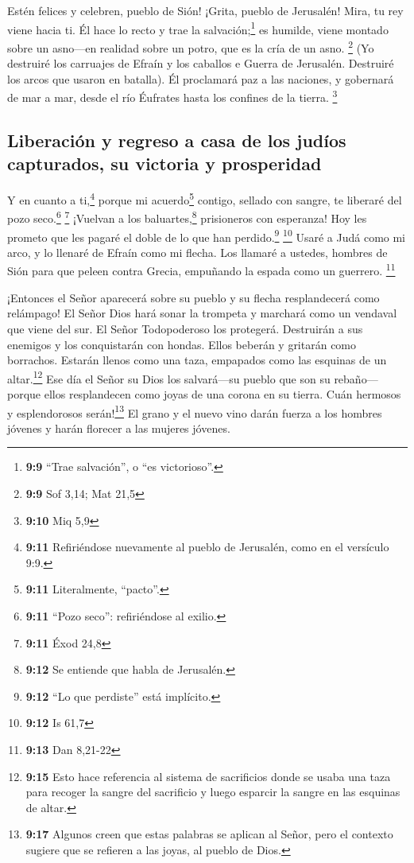  Estén felices y celebren, pueblo de Sión! ¡Grita, pueblo
de Jerusalén! Mira, tu rey viene hacia ti. Él hace lo recto y trae la
salvación;\footnote{\textbf{9:9} ``Trae salvación'', o ``es
  victorioso''.} es humilde, viene montado sobre un asno---en realidad
sobre un potro, que es la cría de un asno. \footnote{\textbf{9:9} Sof
  3,14; Mat 21,5}  (Yo destruiré los carruajes de Efraín
y los caballos e Guerra de Jerusalén. Destruiré los arcos que usaron en
batalla). Él proclamará paz a las naciones, y gobernará de mar a mar,
desde el río Éufrates hasta los confines de la tierra. \footnote{\textbf{9:10}
  Miq 5,9}

\hypertarget{liberaciuxf3n-y-regreso-a-casa-de-los-juduxedos-capturados-su-victoria-y-prosperidad}{%
\subsection{Liberación y regreso a casa de los judíos capturados, su
victoria y
prosperidad}\label{liberaciuxf3n-y-regreso-a-casa-de-los-juduxedos-capturados-su-victoria-y-prosperidad}}

 Y en cuanto a ti,\footnote{\textbf{9:11} Refiriéndose
  nuevamente al pueblo de Jerusalén, como en el versículo 9:9.} porque
mi acuerdo\footnote{\textbf{9:11} Literalmente, ``pacto''.} contigo,
sellado con sangre, te liberaré del pozo seco.\footnote{\textbf{9:11}
  ``Pozo seco'': refiriéndose al exilio.} \footnote{\textbf{9:11} Éxod
  24,8}  ¡Vuelvan a los baluartes,\footnote{\textbf{9:12}
  Se entiende que habla de Jerusalén.} prisioneros con esperanza! Hoy
les prometo que les pagaré el doble de lo que han perdido.\footnote{\textbf{9:12}
  ``Lo que perdiste'' está implícito.} \footnote{\textbf{9:12} Is 61,7}
 Usaré a Judá como mi arco, y lo llenaré de Efraín como
mi flecha. Los llamaré a ustedes, hombres de Sión para que peleen contra
Grecia, empuñando la espada como un guerrero. \footnote{\textbf{9:13}
  Dan 8,21-22}

 ¡Entonces el Señor aparecerá sobre su pueblo y su flecha
resplandecerá como relámpago! El Señor Dios hará sonar la trompeta y
marchará como un vendaval que viene del sur.  El Señor
Todopoderoso los protegerá. Destruirán a sus enemigos y los conquistarán
con hondas. Ellos beberán y gritarán como borrachos. Estarán llenos como
una taza, empapados como las esquinas de un altar.\footnote{\textbf{9:15}
  Esto hace referencia al sistema de sacrificios donde se usaba una taza
  para recoger la sangre del sacrificio y luego esparcir la sangre en
  las esquinas de altar.}  Ese día el Señor su Dios los
salvará---su pueblo que son su rebaño---porque ellos resplandecen como
joyas de una corona en su tierra.  Cuán hermosos y
esplendorosos serán!\footnote{\textbf{9:17} Algunos creen que estas
  palabras se aplican al Señor, pero el contexto sugiere que se refieren
  a las joyas, al pueblo de Dios.} El grano y el nuevo vino darán fuerza
a los hombres jóvenes y harán florecer a las mujeres jóvenes.

